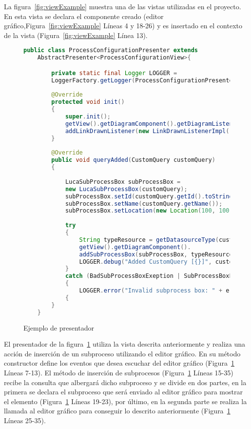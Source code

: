 La figura~\ref{fig:viewExample} muestra una de las vistas utilizadas en el proyecto. En esta vista se declara el componente creado (editor gráfico,Figura~\ref{fig:viewExample} Líneas 4 y 18-26) y es insertado en el contexto de la vista (Figura~\ref{fig:viewExample} Línea 13).


\begin{figure}[H]
	\centering
	\begin{lstlisting}[language=Java]
	public class ProcessConfigurationPresenter extends 
	AbstractPresenter<ProcessConfigurationView>{

		private static final Logger LOGGER = 
		LoggerFactory.getLogger(ProcessConfigurationPresenter.class);
		
		@Override
		protected void init()
		{	
			super.init();
			getView().getDiagramComponent().getDiagramListener().
			addLinkDrawnListener(new LinkDrawnListenerImpl());
		}
		
		@Override
		public void queryAdded(CustomQuery customQuery)
		{
		
			LucaSubProcessBox subProcessBox = 
			new LucaSubProcessBox(customQuery);
			subProcessBox.setId(customQuery.getId().toString());
			subProcessBox.setName(customQuery.getName());
			subProcessBox.setLocation(new Location(100, 100));
		
			try
			{	
				String typeResource = getDatasourceType(customQuery);
				getView().getDiagramComponent().
				addSubProcessBox(subProcessBox, typeResource);
				LOGGER.debug("Added CustomQuery [{}]", customQuery.getName());
			}
			catch (BadSubProcessBoxExeption | SubProcessBoxExists e)
			{
				LOGGER.error("Invalid subprocess box: " + e.getMessage());
			{
		}
	}\end{lstlisting}
	\caption{Ejemplo de presentador}
	\label{fig:presenterExample}
\end{figure}

El presentador de la figura~\ref{fig:presenterExample} utiliza la vista descrita anteriormente y realiza una acción de inserción de un subproceso utilizando el editor gráfico. En su método constructor define los eventos que desea escuchar del editor gráfico (Figura~\ref{fig:presenterExample} Líneas 7-13). El método de inserción de subprocesos (Figura~\ref{fig:presenterExample} Líneas 15-35) recibe la consulta que albergará dicho subproceso y se divide en dos partes, en la primera se declara el subproceso que será enviado al editor gráfico para mostrar el elemento (Figura~\ref{fig:presenterExample} Líneas 19-23), por último, en la segunda parte se realiza la llamada al editor gráfico para conseguir lo descrito anteriormente (Figura~\ref{fig:presenterExample} Líneas 25-35).

